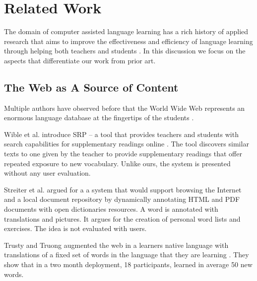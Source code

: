 \section{Related Work}

The domain of computer assisted language learning has a rich history of applied research that aims to improve the effectiveness and efficiency of language learning through helping both teachers and students \cite{levy2013call}. In this discussion we focus on the aspects that differentiate our work from prior art.


\subsection{The Web as A Source of Content}

Multiple authors have observed before that the World Wide Web represents an enormous language database at the fingertips of the students \cite{Fried08-Learner,Hira07-WebCorpora,Streit05-Browsers,Wible01-Exposure,Trus11web}. 


	Wible et al. introduce SRP -- a tool that provides teachers and students with search capabilities for supplementary readings online \cite{Wible01-Exposure}.
	The tool discovers similar texts to one given by the teacher to provide supplementary readings that offer repeated exposure to new vocabulary.
	Unlike ours, the system is presented without any user evaluation.

	
	Streiter et al. \cite{Streit05-Browsers} argued for a a system that would support browsing the Internet and a local document repository by dynamically annotating HTML and PDF documents with open dictionaries resources. A word is annotated with translations and pictures. It argues for the creation of personal word lists and exercises. The idea is not evaluated with users. 

	
	Trusty and Truong augmented the web in a learners native language with translations of a fixed set of words in the language that they are learning \cite{Trus11web}. They show that in a two month deployment, 18 participants, learned in average 50 new words.

